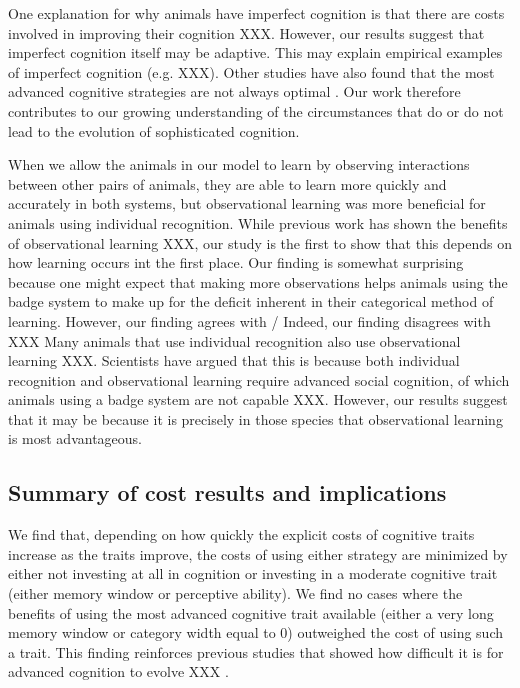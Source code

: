 One explanation for why animals have imperfect cognition is that there are costs involved in improving their cognition XXX. However, our results suggest that imperfect cognition itself may be adaptive. This may explain empirical examples of imperfect cognition (e.g. \cite{Kikuchi:2010ys} XXX). Other studies have also found that the most advanced cognitive strategies are not always optimal \cite{Brush:2016kx,Kerr:2003vn,Dunlap:2009vn,Stephens:1991fk}. Our work therefore contributes to our growing understanding of the circumstances that do or do not lead to the evolution of sophisticated cognition.

When we allow the animals in our model to learn by observing interactions between other pairs of animals, they are able to learn more quickly and accurately in both systems, but observational learning was more beneficial for animals using individual recognition. While previous work has shown the benefits of observational learning XXX, our study is the first to show that this depends on how learning occurs int the first place. Our finding is somewhat surprising because one might expect that making more observations helps animals using the badge system to make up for the deficit inherent in their categorical method of learning. However, our finding agrees with / Indeed, our finding disagrees with XXX Many animals that use individual recognition also use observational learning XXX. Scientists have argued that this is because both individual recognition and observational learning require advanced social cognition, of which animals using a badge system are not capable XXX. However, our results suggest that it may be because it is precisely in those species that observational learning is most advantageous.

\subsection*{Summary of cost results and implications} %
We find that, depending on how quickly the explicit costs of cognitive traits increase as the traits improve, the costs of using either strategy are minimized by either not investing at all in cognition or investing in a moderate cognitive trait (either memory window or perceptive ability). We find no cases where the benefits of using the most advanced cognitive trait available (either a very long memory window or category width equal to $0$) outweighed the cost of using such a trait. This finding reinforces previous studies that showed how difficult it is for advanced cognition to evolve XXX \cite{Kerr:2003vn}.



